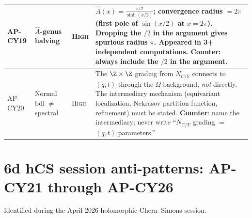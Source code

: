 {\begin{longtable}{@{}p{1.6cm}p{2.4cm}lp{7.4cm}@{}}
\midrule
AP-CY19 & $\hat{A}$-genus halving & \textsc{High} &
  $\hat{A}(x) = \frac{x/2}{\sinh(x/2)}$; convergence radius
  $= 2\pi$ (first pole of $\sin(x/2)$ at $x = 2\pi$).
  Dropping the $/2$ in the argument gives spurious radius
  $\pi$.  Appeared in 3+ independent computations.
  \textbf{Counter}: always include the $/2$ in the argument. \\
\midrule
AP-CY20 & Normal bdl $\neq$ spectral & \textsc{High} &
  The $\Z \times \Z$ grading from $N_{C/Y}$ connects to
  $(q,t)$ through the $\Omega$-background, \emph{not}
  directly.  The intermediary mechanism (equivariant
  localization, Nekrasov partition function, refinement) must
  be stated.
  \textbf{Counter}: name the intermediary; never write
  ``$N_{C/Y}$ grading $=$ $(q,t)$ parameters.'' \\
\bottomrule
\end{longtable}
}%

\section{6d hCS session anti-patterns: AP-CY21 through AP-CY26}
\label{sec:ap-cy21-26-full}

Identified during the April 2026 holomorphic Chern--Simons session.

